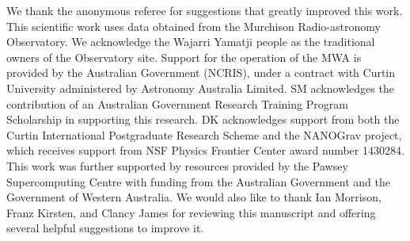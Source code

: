 \documentclass{pasa}%
\begin{document}
\begin{acknowledgements}
We thank the anonymous referee for suggestions that greatly improved this work.
This scientific work uses data obtained from the Murchison Radio-astronomy Observatory. We acknowledge the Wajarri Yamatji people as the traditional owners of the Observatory site.
Support for the operation of the MWA is provided by the Australian Government (NCRIS), under a contract with Curtin University administered by Astronomy Australia Limited.
SM acknowledges the contribution of an Australian Government Research Training Program Scholarship in supporting this research.
DK acknowledges support from both the Curtin International Postgraduate Research Scheme and the NANOGrav project, which receives support from NSF Physics Frontier Center award number 1430284.
This work was further supported by resources provided by the Pawsey Supercomputing Centre with funding from the Australian Government and the Government of Western Australia.
We would also like to thank Ian Morrison, Franz Kirsten, and Clancy James for reviewing this manuscript and offering several helpful suggestions to improve it.
\end{acknowledgements}
\end{document}
